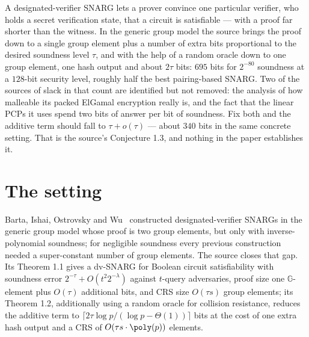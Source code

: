 \documentclass{conjura-conjecture}
\newcommand{\G}{\mathbb{G}}
\begin{document}

\vspace{0.4em}

\begin{informalconjecture}
A designated-verifier SNARG lets a prover convince one particular
verifier, who holds a secret verification state, that a circuit is
satisfiable --- with a proof far shorter than the witness. In the generic
group model the source brings the proof down to a single group element
plus a number of extra bits proportional to the desired soundness level
$\tau$, and with the help of a random oracle down to one group element,
one hash output and about $2\tau$ bits: $695$ bits for $2^{-80}$
soundness at a $128$-bit security level, roughly half the best
pairing-based SNARG\@. Two of the sources of slack in that count are
identified but not removed: the analysis of how malleable its packed
ElGamal encryption really is, and the fact that the linear PCPs it uses
spend two bits of answer per bit of soundness. Fix both and the additive
term should fall to $\tau + o(\tau)$ --- about $340$ bits in the same
concrete setting. That is the source's Conjecture 1.3, and nothing in the
paper establishes it.
\end{informalconjecture}

\section{The setting}\label{sec:setting}

Barta, Ishai, Ostrovsky and Wu~\cite{BIOW20} constructed
designated-verifier SNARGs in the generic group model whose proof is two
group elements, but only with inverse-polynomial soundness; for
negligible soundness every previous construction needed a super-constant
number of group elements. The source closes that gap. Its Theorem 1.1
gives a dv-SNARG for Boolean circuit satisfiability with soundness error
$2^{-\tau} + O(t^{2} 2^{-\lambda})$ against $t$-query adversaries, proof
size one $\G$-element plus $O(\tau)$ additional bits, and CRS size
$O(\tau s)$ group elements; its Theorem 1.2, additionally using a random
oracle for collision resistance, reduces the additive term to
$\lceil 2\tau \log p / (\log p - \Theta(1)) \rceil$ bits at the cost of
one extra hash output and a CRS of $O(\tau s \cdot \poly(p))$ elements.
\end{document}
